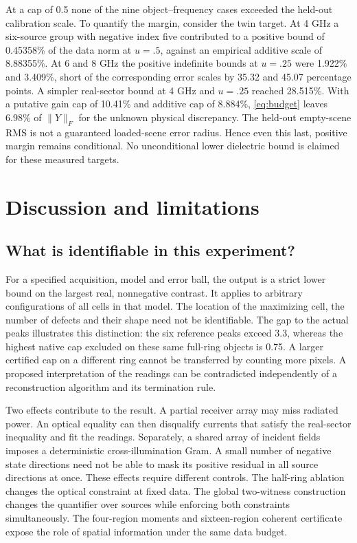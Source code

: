 \documentclass[anonymous,12pt]{iopjournal}
\theoremstyle{remark}\newtheorem{remark}[theorem]{Remark}
\numberwithin{equation}{section}
\begin{document}
At a cap of 0.5 none of the nine object--frequency cases exceeded the held-out calibration scale. To quantify the margin, consider the twin target. At 4 GHz a six-source group with negative index five contributed to a positive bound of 0.45358\% of the data norm at $u=.5$, against an empirical additive scale of 8.88355\%. At 6 and 8 GHz the positive indefinite bounds at $u=.25$ were 1.922\% and 3.409\%, short of the corresponding error scales by 35.32 and 45.07 percentage points. A simpler real-sector bound at 4 GHz and $u=.25$ reached 28.515\%. With a putative gain cap of 10.41\% and additive cap of 8.884\%, \eqref{eq:budget} leaves 6.98\% of $\|Y\|_F$ for the unknown physical discrepancy. The held-out empty-scene RMS is not a guaranteed loaded-scene error radius. Hence even this last, positive margin remains conditional. No unconditional lower dielectric bound is claimed for these measured targets.

\section{Discussion and limitations}\label{sec:discuss}

\subsection{What is identifiable in this experiment?}
For a specified acquisition, model and error ball, the output is a strict lower bound on the largest real, nonnegative contrast. It applies to arbitrary configurations of all cells in that model. The location of the maximizing cell, the number of defects and their shape need not be identifiable. The gap to the actual peaks illustrates this distinction: the six reference peaks exceed 3.3, whereas the highest native cap excluded on these same full-ring objects is 0.75. A larger certified cap on a different ring cannot be transferred by counting more pixels. A proposed interpretation of the readings can be contradicted independently of a reconstruction algorithm and its termination rule.

Two effects contribute to the result. A partial receiver array may miss radiated power. An optical equality can then disqualify currents that satisfy the real-sector inequality and fit the readings. Separately, a shared array of incident fields imposes a deterministic cross-illumination Gram. A small number of negative state directions need not be able to mask its positive residual in all source directions at once. These effects require different controls. The half-ring ablation changes the optical constraint at fixed data. The global two-witness construction changes the quantifier over sources while enforcing both constraints simultaneously. The four-region moments and sixteen-region coherent certificate expose the role of spatial information under the same data budget.
\end{document}
